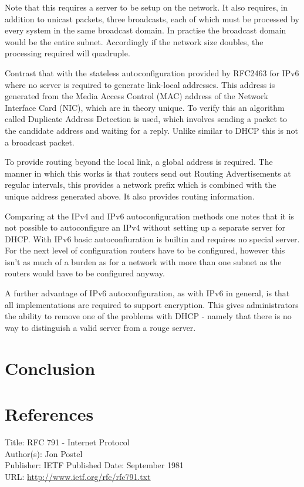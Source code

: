 \documentclass[a4paper,12pt]{article}
\begin{document}
Note that this requires a server to be setup on the network. It also requires,
in addition to unicast packets, three broadcasts, each of which must be
processed by every system in the same broadcast domain. In practise the
broadcast domain would be the entire subnet. Accordingly if the network size
doubles, the processing required will quadruple.

Contrast that with the stateless autoconfiguration provided by RFC2463 for
IPv6 where no server is required to generate link-local addresses. This address
is generated from the Media Access Control (MAC) address of the Network
Interface Card (NIC), which are in theory unique. To verify this an algorithm called
Duplicate Address Detection is used, which involves sending a packet to the
candidate address and waiting for a reply. Unlike similar to DHCP this is not a
broadcast packet.

To provide routing beyond the local link, a global address is required. The
manner in which this works is that routers send out Routing Advertisements at
regular intervals, this provides a network prefix which is combined with the
unique address generated above. It also provides routing information.

Comparing at the IPv4 and IPv6 autoconfiguration methods one notes that it is
not possible to autoconfigure an IPv4 without setting up a separate server for
DHCP. With IPv6 basic autoconfiuration is builtin and requires no special
server. For the next level of configuration routers have to be configured,
however this isn't as much of a burden as for a network with more than one
subnet as the routers would have to be configured anyway.

A further advantage of IPv6 autoconfiguration, as with IPv6 in general, is that
all implementations are required to support encryption. This gives
administrators the ability to remove one of the problems with DHCP - namely
that there is no way to distinguish a valid server from a rouge server.

\section{Conclusion}


\section{References}

Title: RFC 791 - Internet Protocol \\
Author(s): Jon Postel \\
Publisher: IETF
Published Date: September 1981 \\
URL: \url{http://www.ietf.org/rfc/rfc791.txt}	 
\end{document}
